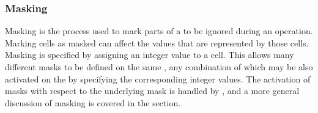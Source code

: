 \documentclass[letterpaper,10pt,english]{sphinxmanual}
\begin{document}
\begin{sphinxVerbatim}[commandchars=\\\{\}]
  \PYG{p}{[}\PYG{p}{]} 
                      
\end{sphinxVerbatim}


\subsubsection{Masking}
\label{\detokenize{api:masking}}
Masking is the process used to mark parts of a {\hyperref[\detokenize{grid:ESMF.api.grid.Grid}]{}} to be ignored during an
operation. Marking {\hyperref[\detokenize{grid:ESMF.api.grid.Grid}]{}} cells as masked can affect the {\hyperref[\detokenize{field:ESMF.api.field.Field}]{}} values that are
represented by those cells. Masking is specified by assigning an integer value
to a {\hyperref[\detokenize{grid:ESMF.api.grid.Grid}]{}} cell. This allows many different masks to be defined on the same {\hyperref[\detokenize{grid:ESMF.api.grid.Grid}]{}},
any combination of which may be also activated on the {\hyperref[\detokenize{field:ESMF.api.field.Field}]{}} by specifying the
corresponding integer values. The activation of {\hyperref[\detokenize{field:ESMF.api.field.Field}]{}} masks with respect to the
underlying {\hyperref[\detokenize{grid:ESMF.api.grid.Grid}]{}} mask is handled by {\hyperref[\detokenize{regrid:ESMF.api.regrid.Regrid}]{}}, and a more
general discussion of masking is covered in the {\hyperref[\detokenize{api:id8}]{}}
section.
\end{document}
